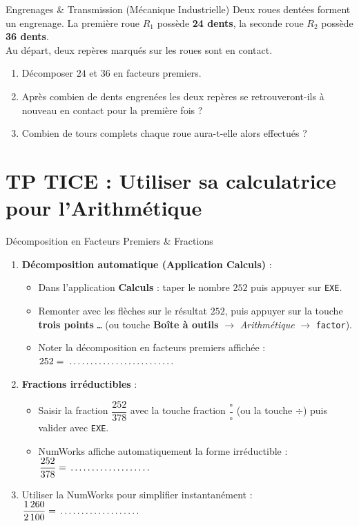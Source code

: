 \begin{exercice}[4 pts]{\capRealiser}{Engrenages \& Transmission (Mécanique Industrielle)}
Deux roues dentées forment un engrenage. La première roue $R_1$ possède \textbf{24 dents}, la seconde roue $R_2$ possède \textbf{36 dents}.\\
Au départ, deux repères marqués sur les roues sont en contact.

\begin{enumerate}
    \item Décomposer $24$ et $36$ en facteurs premiers.
    \item Après combien de dents engrenées les deux repères se retrouveront-ils à nouveau en contact pour la première fois ?
    \item Combien de tours complets chaque roue aura-t-elle alors effectués ?
\end{enumerate}
\lignesreponse[5]
\end{exercice}

\section{TP TICE : Utiliser sa calculatrice pour l'Arithmétique}

\begin{tpinfo}{Décomposition en Facteurs Premiers \& Fractions}
\begin{enumerate}
    \item \textbf{Décomposition automatique (Application Calculs)} :
    \begin{itemize}
        \item Dans l'application \textbf{Calculs} : taper le nombre $252$ puis appuyer sur \texttt{EXE}.
        \item Remonter avec les flèches sur le résultat $252$, puis appuyer sur la touche \textbf{trois points} \texttt{\dots} (ou touche \textbf{Boîte à outils} $\rightarrow$ \textit{Arithmétique} $\rightarrow$ \texttt{factor}).
        \item Noter la décomposition en facteurs premiers affichée : $252 = \pointille[4cm]$
    \end{itemize}
    \item \textbf{Fractions irréductibles} :
    \begin{itemize}
        \item Saisir la fraction $\dfrac{252}{378}$ avec la touche fraction $\dfrac{\square}{\square}$ (ou la touche $\div$) puis valider avec \texttt{EXE}.
        \item NumWorks affiche automatiquement la forme irréductible : $\dfrac{252}{378} = \pointille[3cm]$
    \end{itemize}
    \item Utiliser la NumWorks pour simplifier instantanément : $\dfrac{1\,260}{2\,100} = \pointille[3cm]$
\end{enumerate}
\end{tpinfo}

